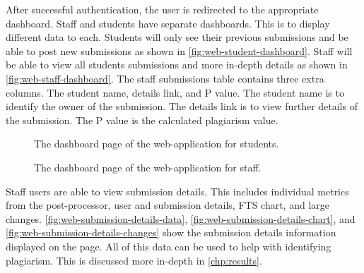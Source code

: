 After successful authentication, the user is redirected to the appropriate dashboard. Staff and students have separate dashboards. This is to display different data to each. Students will only see their previous submissions and be able to post new submissions as shown in \autoref{fig:web-student-dashboard}. Staff will be able to view all students submissions and more in-depth details as shown in \autoref{fig:web-staff-dashboard}. The staff submissions table contains three extra columns. The student name, details link, and P value. The student name is to identify the owner of the submission. The details link is to view further details of the submission. The P value is the calculated plagiarism value.

\begin{figure}[H]
  \centering
  \caption[Web Student Dashboard Page]{The dashboard page of the web-application for students.}
  \label{fig:web-student-dashboard}
\end{figure}

\begin{figure}[H]
  \centering
  \caption[Web Staff Dashboard Page]{The dashboard page of the web-application for staff.}
  \label{fig:web-staff-dashboard}
\end{figure}

Staff users are able to view submission details. This includes individual metrics from the post-processor, user and submission details, FTS chart, and large changes. \autoref{fig:web-submission-details-data}, \autoref{fig:web-submission-details-chart}, and \autoref{fig:web-submission-details-changes} show the submission details information displayed on the page. All of this data can be used to help with identifying plagiarism. This is discussed more in-depth in \autoref{chp:results}.

